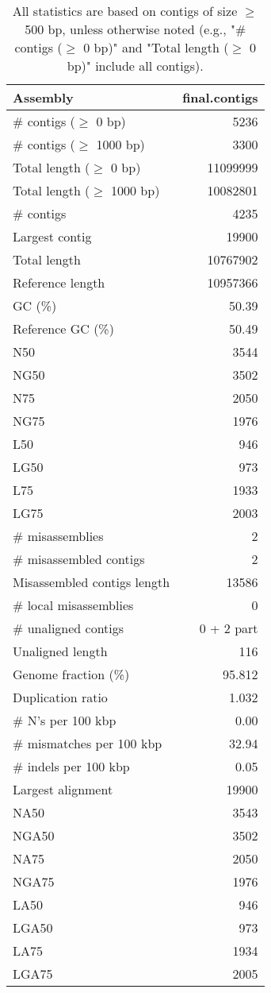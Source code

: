 \documentclass[12pt,a4paper]{article}
\begin{document}
\begin{table}[ht]
\begin{center}
\caption{All statistics are based on contigs of size $\geq$ 500 bp, unless otherwise noted (e.g., "\# contigs ($\geq$ 0 bp)" and "Total length ($\geq$ 0 bp)" include all contigs).}
\begin{tabular}{|l*{1}{|r}|}
\hline
Assembly & final.contigs \\ \hline
\# contigs ($\geq$ 0 bp) & 5236 \\ \hline
\# contigs ($\geq$ 1000 bp) & 3300 \\ \hline
Total length ($\geq$ 0 bp) & 11099999 \\ \hline
Total length ($\geq$ 1000 bp) & 10082801 \\ \hline
\# contigs & 4235 \\ \hline
Largest contig & 19900 \\ \hline
Total length & 10767902 \\ \hline
Reference length & 10957366 \\ \hline
GC (\%) & 50.39 \\ \hline
Reference GC (\%) & 50.49 \\ \hline
N50 & 3544 \\ \hline
NG50 & 3502 \\ \hline
N75 & 2050 \\ \hline
NG75 & 1976 \\ \hline
L50 & 946 \\ \hline
LG50 & 973 \\ \hline
L75 & 1933 \\ \hline
LG75 & 2003 \\ \hline
\# misassemblies & 2 \\ \hline
\# misassembled contigs & 2 \\ \hline
Misassembled contigs length & 13586 \\ \hline
\# local misassemblies & 0 \\ \hline
\# unaligned contigs & 0 + 2 part \\ \hline
Unaligned length & 116 \\ \hline
Genome fraction (\%) & 95.812 \\ \hline
Duplication ratio & 1.032 \\ \hline
\# N's per 100 kbp & 0.00 \\ \hline
\# mismatches per 100 kbp & 32.94 \\ \hline
\# indels per 100 kbp & 0.05 \\ \hline
Largest alignment & 19900 \\ \hline
NA50 & 3543 \\ \hline
NGA50 & 3502 \\ \hline
NA75 & 2050 \\ \hline
NGA75 & 1976 \\ \hline
LA50 & 946 \\ \hline
LGA50 & 973 \\ \hline
LA75 & 1934 \\ \hline
LGA75 & 2005 \\ \hline
\end{tabular}
\end{center}
\end{table}
\end{document}
